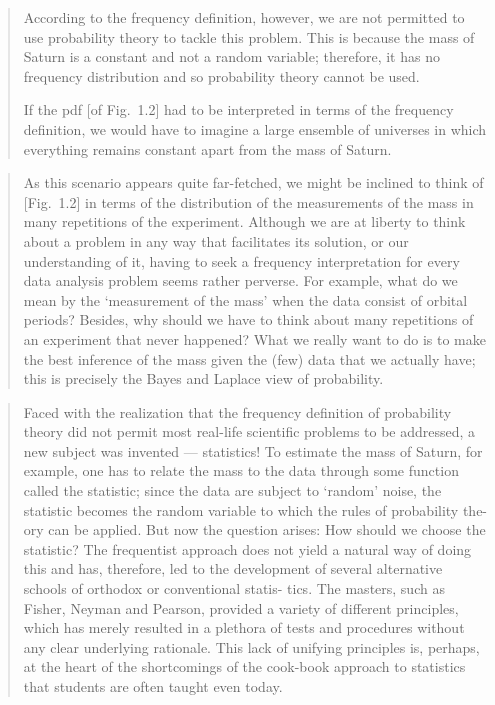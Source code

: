 \documentclass[%
oneside,                 %
final,                   %
10pt]{article}
\begin{document}

\begin{quote}
According to the frequency definition, however, we are not permitted to use probability theory to tackle this problem. This is because the mass of Saturn is a constant and not a random variable; therefore, it has no frequency distribution and so probability theory cannot be used.

If the pdf [of Fig.~1.2] had to be interpreted in terms of the frequency definition, we would have to imagine a large ensemble of universes in which everything remains constant apart from the mass of Saturn.
\end{quote}



\begin{quote}
As this scenario appears quite far-fetched, we might be inclined to think of [Fig.~1.2] in terms of the distribution of the measurements of the mass in many repetitions of the experiment. Although we are at liberty to think about a problem in any way that facilitates its solution, or our understanding of it, having to seek a frequency interpretation for every data analysis problem seems rather perverse.
For example, what do we mean by the ‘measurement of the mass’ when the data consist of orbital periods? Besides, why should we have to think about many repetitions of an experiment that never happened? What we really want to do is to make the best inference of the mass given the (few) data that we actually have; this is precisely the Bayes and Laplace view of probability.
\end{quote}



\begin{quote}
Faced with the realization that the frequency definition of probability theory did not permit most real-life scientific problems to be addressed, a new subject was invented — statistics! To estimate the mass of Saturn, for example, one has to relate the mass to the data through some function called the statistic; since the data are subject to ‘random’ noise, the statistic becomes the random variable to which the rules of probability the- ory can be applied. But now the question arises: How should we choose the statistic? The frequentist approach does not yield a natural way of doing this and has, therefore, led to the development of several alternative schools of orthodox or conventional statis- tics. The masters, such as Fisher, Neyman and Pearson, provided a variety of different principles, which has merely resulted in a plethora of tests and procedures without any clear underlying rationale. This lack of unifying principles is, perhaps, at the heart of the shortcomings of the cook-book approach to statistics that students are often taught even today.
\end{quote}
\end{document}
